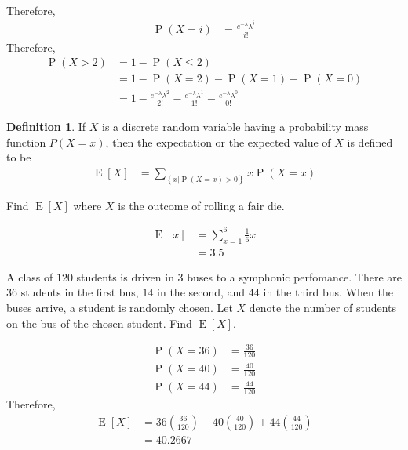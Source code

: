 \documentclass[titlepage, fleqn, a4paper, 12pt, twoside]{article}
\theoremstyle{definition}
\newtheorem{definition}{Definition}
\theoremstyle{theorem}
\DeclareMathOperator{\prob}{\mathrm{P}}
\DeclareMathOperator{\expct}{\mathrm{E}}
\begin{document}
\begin{solution}
\begin{enumerate}[leftmargin=*]
\begin{align*}
			\end{align*}
			Therefore,
			\begin{align*}
				\prob(X = i) & = \frac{e^{-\lambda} \lambda^i}{i!}
			\end{align*}
			Therefore,
			\begin{align*}
				\prob(X > 2) & = 1 - \prob(X \le 2)                             \\
                                             & = 1 - \prob(X = 2) - \prob(X = 1) - \prob(X = 0) \\
                                             & = 1 - \frac{e^{-\lambda} \lambda^2}{2!} - \frac{e^{-\lambda} \lambda^1}{1!} - \frac{e^{-\lambda} \lambda^0}{0!}
			\end{align*}
	\end{enumerate}
\end{solution}

\begin{definition}
	If $X$ is a discrete random variable having a probability mass function $P(X = x)$, then the expectation or the expected value of $X$ is defined to be
	\begin{align*}
		\expct[X] & = \sum\limits_{\left\{ x | \prob(X = x) > 0 \right\}} x \prob(X = x)
	\end{align*}
\end{definition}

\begin{question}
	Find $\expct[X]$ where $X$ is the outcome of rolling a fair die.
\end{question}

\begin{solution}
	\begin{align*}
		\expct[x] & = \sum\limits_{x = 1}^{6} \frac{1}{6} x \\
                          & = 3.5
	\end{align*}
\end{solution}

\begin{question}
	A class of $120$ students is driven in $3$ buses to a symphonic perfomance.
	There are $36$ students in the first bus, $14$ in the second, and $44$ in the third bus.
	When the buses arrive, a student is randomly chosen.
	Let $X$ denote the number of students on the bus of the chosen student.
	Find $\expct[X]$.
\end{question}

\begin{solution}
	\begin{align*}
		\prob(X = 36) & = \frac{36}{120} \\
		\prob(X = 40) & = \frac{40}{120} \\
		\prob(X = 44) & = \frac{44}{120}
	\end{align*}
	Therefore,
	\begin{align*}
		\expct[X] & = 36 \left( \frac{36}{120} \right) + 40 \left( \frac{40}{120} \right) + 44 \left( \frac{44}{120} \right) \\
                          & = 40.2667
	\end{align*}
\end{solution}
\end{document}
